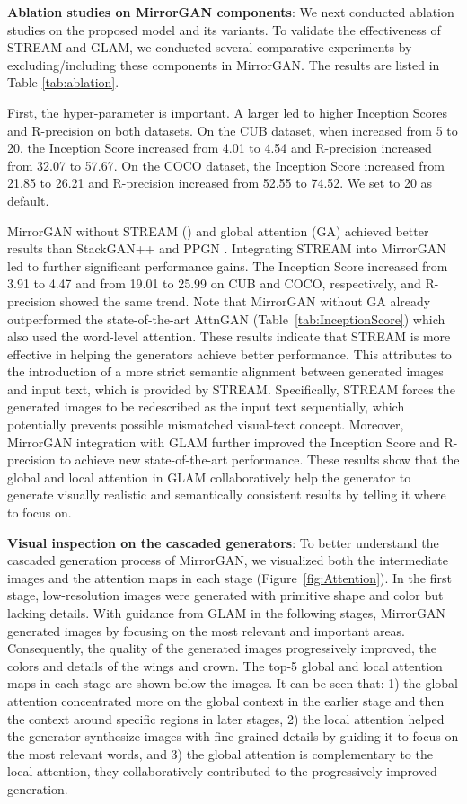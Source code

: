\documentclass[10pt,twocolumn,letterpaper]{article}
\begin{document}
\textbf{Ablation studies on MirrorGAN components}:
We next conducted ablation studies on the proposed model and its variants. To validate the effectiveness of STREAM and GLAM, we conducted several comparative experiments by excluding/including these components in MirrorGAN. The results are listed in Table \ref{tab:ablation}. 

First, the hyper-parameter  is important. A larger  led to higher Inception Scores and R-precision on both datasets. On the CUB dataset, 
when  increased from 5 to 20, the Inception Score increased from 4.01 to 4.54 and R-precision increased from 32.07 to 57.67. 
On the COCO dataset, the Inception Score increased from 21.85 to 26.21 and R-precision increased from 52.55 to 74.52. We set  to 20 as default.

MirrorGAN without STREAM () and global attention (GA) achieved better results than StackGAN++ \cite{zhang2017stackgan++} and PPGN \cite{nguyen2017plug}. Integrating STREAM into MirrorGAN led to further significant performance gains. The Inception Score increased from 3.91 to 4.47 and from 19.01 to 25.99 on CUB and COCO, respectively, and R-precision showed the same trend. Note that MirrorGAN without GA already outperformed the state-of-the-art AttnGAN (Table~\ref{tab:InceptionScore}) which also used the word-level attention. These results indicate that STREAM is more effective in helping the generators achieve better performance. This attributes to the introduction of a more strict semantic alignment between generated images and input text, which is provided by STREAM. Specifically, STREAM forces the generated images to be redescribed as the input text sequentially, which potentially prevents possible mismatched visual-text concept. Moreover, MirrorGAN integration with GLAM further improved the Inception Score and R-precision to achieve new state-of-the-art performance. These results show that the global and local attention in GLAM collaboratively help the generator to generate visually realistic and semantically consistent results by telling it where to focus on.

\textbf{Visual inspection on the cascaded generators}: 
To better understand the cascaded generation process of MirrorGAN, we visualized both the intermediate images and the attention maps in each stage (Figure~\ref{fig:Attention}). In the first stage, low-resolution images were generated with primitive shape and color but lacking details. With guidance from GLAM in the following stages, MirrorGAN generated images by focusing on the most relevant and important areas. Consequently, the quality of the generated images progressively improved,  the colors and details of the wings and crown. The top-5 global and local attention maps in each stage are shown below the images. It can be seen that: 1) the global attention concentrated more on the global context in the earlier stage and then the context around specific regions in later stages, 2) the local attention helped the generator synthesize images with fine-grained details by guiding it to focus on the most relevant words, and 3) the global attention is complementary to the local attention, they collaboratively contributed to the progressively improved generation.
\end{document}
